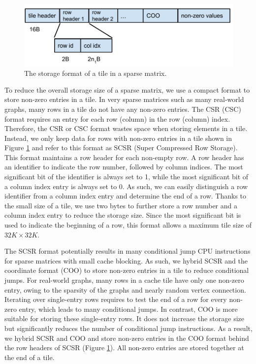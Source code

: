 \begin{figure}
\centering
\includegraphics[scale=0.5]{./tile_format.pdf}
\caption{The storage format of a tile in a sparse matrix.}
\label{tile_format}
\end{figure}

To reduce the overall storage size of a sparse matrix, we use a compact format
to store non-zero entries in a tile. In very sparse matrices such as
many real-world graphs, many rows in a tile do not have any non-zero entries.
The CSR (CSC) format requires an entry for each row (column) in the row
(column) index. Therefore, the CSR or CSC format wastes space when storing elements
in a tile. Instead, we only keep data for rows with non-zero entries in a tile
shown in Figure \ref{tile_format} and refer to this format as SCSR (Super
Compressed Row Storage). This format maintains a row header for each non-empty
row. A row header has an identifier to indicate the row number, followed by
column indices. 
The most significant bit of the identifier is always set to 1, while the most
significant bit of a column index entry is always set to 0. As such, we can easily
distinguish a row identifier from a column index entry and determine the end
of a row. Thanks to the small size of a tile, we use two bytes to further store a row
number and a column index entry to reduce the storage size. Since the most
significant bit is used to indicate the beginning of a row, this format allows
a maximum tile size of $32K \times 32K$.

The SCSR format potentially results in many conditional jump CPU instructions
for sparse matrices with small cache blocking. As such, we hybrid SCSR and
the coordinate format (COO) to store non-zero entries in a tile to reduce
conditional jumps.
For real-world graphs, many rows in a cache tile have only one non-zero entry,
owing to the sparsity of the graphs and nearly random vertex connection.
Iterating over single-entry rows requires to test the end of a row for every
non-zero entry, which leads to many conditional jumps.
In contrast, COO is more suitable for storing these
single-entry rows. It does not increase the storage size but significantly
reduces the number of conditional jump instructions. As a result, we hybrid
SCSR and COO and store non-zero entries in the COO format behind the row headers
of SCSR (Figure \ref{tile_format}). All non-zero entries are
stored together at the end of a tile.

